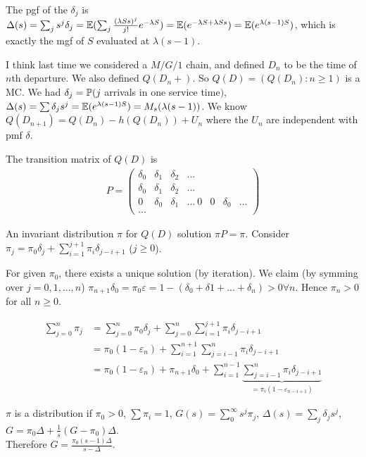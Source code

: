 \documentclass[a4paper]{article}
\begin{document}
The pgf of the $\delta_j$ is $\Delta(s) = \sum_j s^j \delta_j = \E(\sum_j \frac{(\lambda Ss)^j}{j!} e^{-\lambda S}) =\E (e^{-\lambda S + \lambda Ss}) =\E (e^{\lambda(s-1)S})$, which is exactly the mgf of $S$ evaluated at $\lambda(s-1)$.

I think last time we considered a $M/G/1$ chain, and defined $D_n$ to be the time of $n$th departure. We also defined $Q(D_n+)$. So $Q(D) = (Q(D_n):n \geq 1)$ is a MC. We had $\delta_j = \P(j$ arrivals in one service time$)$, $\Delta(s) = \sum \delta_j s^j = \E(e^{\lambda(s-1)S}) = M_s(\lambda(s-1))$. We know $Q(D_{n+1}) = Q(D_n) - h(Q(D_n)) + U_n$ where the $U_n$ are independent with pmf $\delta$.

The transition matrix of $Q(D)$ is 
\begin{equation*}
\begin{aligned}
P = \begin{pmatrix}
\delta_0 & \delta_1 & \delta_2 & ...\\
\delta_0 & \delta_1 & \delta_2 & ...\\
0 & \delta_0 & \delta_1 & ...\
0 & 0 & \delta_0 & ...\\
...
\end{pmatrix}
\end{aligned}
\end{equation*}

An invariant distribution $\pi$ for $Q(D)$ solution $\pi P = \pi$. Consider $\pi_j = \pi_0 \delta_j + \sum_{i=1}^{j+1} \pi_i \delta_{j-i+1}$ ($j \geq 0$).

For given $\pi_0$, there exists a unique solution (by iteration). We claim (by symming over $j=0,1,...,n$) $\pi_{n+1} \delta_0 = \pi_0 \varepsilon = 1-(\delta_0+\delta1+...+\delta_n) > 0 \forall n$. Hence $\pi_n > 0$ for all $n \geq 0$.

\begin{equation*}
\begin{aligned}
\sum_{j=0}^n \pi_j &= \sum_{j=0}^n \pi_0 \delta_j + \sum_{j = 0}^n \sum_{i=1}^{j+1} \pi_i \delta_{j-i+1}\\
&= \pi_0(1-\varepsilon_n) + \sum_{i=1}^{n+1} \sum_{j=i-1}^n \pi_i \delta_{j-i+1}\\
&= \pi_0(1-\varepsilon_n) + \pi_{n+1} \delta_0 + \sum_{i=1}^{n-1} \underbrace{\sum_{j=i-1}^n \pi_i \delta_{j-i+1}}_{=\pi_i (1-\varepsilon_{n-i+1})}
\end{aligned}
\end{equation*}

$\pi$ is a distribution if $\pi_0 > 0$, $\sum \pi_i = 1$, $G(s) = \sum_0^\infty s^j \pi_j$, $\Delta(s) = \sum_j \delta_j s^j$, $G= \pi_0 \Delta + \frac{1}{s}(G-\pi_0) \Delta$.\\
Therefore $G = \frac{\pi_0(s-1)\Delta}{s-\Delta}$.
\end{document}
